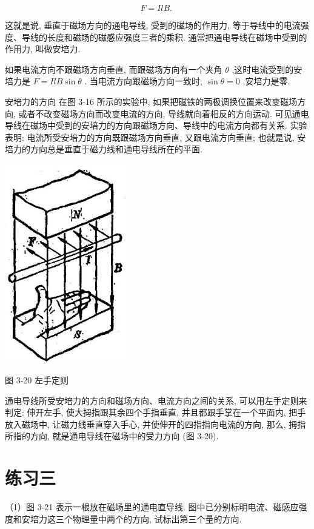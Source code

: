 \documentclass[10pt]{article}
\begin{document}
\[
F = {IlB}\text{. }
\]

这就是说, 垂直于磁场方向的通电导线, 受到的磁场的作用力, 等于导线中的电流强度、导线的长度和磁场的磁感应强度三者的乘积. 通常把通电导线在磁场中受到的作用力, 叫做安培力.

如果电流方向不跟磁场方向垂直, 而跟磁场方向有一个夹角 \(\theta\) ,这时电流受到的安培力是 \(F = {IlB}\sin \theta\) . 当电流方向跟磁场方向一致时, \(\sin \theta = 0\) ,安培力是零.

安培力的方向 在图 3-16 所示的实验中, 如果把磁铁的两极调换位置来改变磁场方向, 或者不改变磁场方向而改变电流的方向, 导线就向着相反的方向运动. 可见通电导线在磁场中受到的安培力的方向跟磁场方向、导线中的电流方向都有关系. 实验表明: 电流所受安培力的方向既跟磁场方向垂直, 又跟电流方向垂直; 也就是说, 安培力的方向总是垂直于磁力线和通电导线所在的平面.

\begin{center}
\includegraphics[max width=0.4\textwidth]{images/01913056-1f15-74d8-9184-9aab52c9d66b_115_994689.jpg}
\end{center}

图 3-20 左手定则

通电导线所受安培力的方向和磁场方向、电流方向之间的关系, 可以用左手定则来判定: 伸开左手, 使大拇指跟其余四个手指垂直, 并且都跟手掌在一个平面内, 把手放入磁场中, 让磁力线垂直穿入手心, 并使伸开的四指指向电流的方向, 那么, 拇指所指的方向, 就是通电导线在磁场中的受力方向 (图 3-20).

\section*{练习三}

（1）图 3-21 表示一根放在磁场里的通电直导线. 图中已分别标明电流、磁感应强度和安培力这三个物理量中两个的方向, 试标出第三个量的方向.
\end{document}
